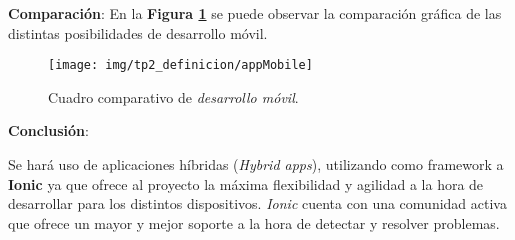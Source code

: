 \textbf{Comparación}:
En la \textbf{Figura \ref{appMobile}} se puede observar la comparación gráfica de las distintas posibilidades de desarrollo móvil.

\begin{figure}
  \centering
  \texttt{[image: img/tp2\_definicion/appMobile]}
  \caption{Cuadro comparativo de \textit{desarrollo móvil}.}
  \label{appMobile}
\end{figure}

\textbf{Conclusión}:

Se hará uso de aplicaciones híbridas (\textit{Hybrid apps}), utilizando como framework a \textbf{Ionic} ya que ofrece al proyecto la máxima flexibilidad y agilidad a la hora de desarrollar para los distintos dispositivos.
\textit{Ionic} cuenta con una comunidad activa que ofrece un mayor y mejor soporte a la hora de detectar y resolver problemas.












